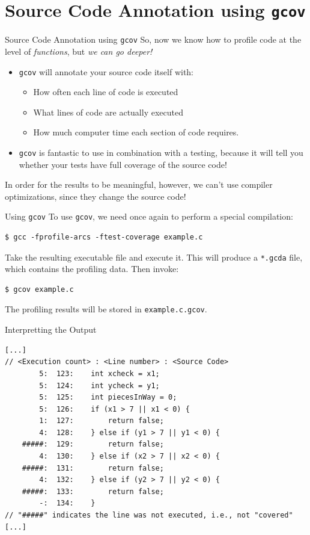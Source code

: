 \documentclass[11pt]{beamer}
\begin{document}
\section[gcov]{Source Code Annotation using \texttt{gcov}}
\begin{frame}{Source Code Annotation using \texttt{gcov}}
So, now we know how to profile code at the level of \emph{functions}, but \emph{we can go deeper!}
\begin{itemize}
\item \texttt{gcov} will annotate your source code itself with: 
\begin{itemize}
\item How often each line of code is executed
\item What lines of code are actually executed
\item How much computer time each section of code requires.
\end{itemize}
\item \texttt{gcov} is fantastic to use in combination with a testing, because it will tell you whether your tests have full coverage of the source code!
\end{itemize}
In order for the results to be meaningful, however, we can't use compiler optimizations, since they change the source code!
\end{frame}

\begin{frame}[fragile=singleslide]{Using \texttt{gcov}}
To use \texttt{gcov}, we need once again to perform a special compilation:
\begin{lstlisting}[style=terminal]
$ gcc -fprofile-arcs -ftest-coverage example.c
\end{lstlisting}
Take the resulting executable file and execute it.  This will produce a \texttt{*.gcda} file, which contains the profiling data. Then invoke:
\begin{lstlisting}[style=terminal]
$ gcov example.c
\end{lstlisting}
The profiling results will be stored in \texttt{example.c.gcov}.
\end{frame}

\begin{frame}[fragile=singleslide]{Interpretting the Output}
\footnotesize
\begin{lstlisting}[style=C]
[...]
// <Execution count> : <Line number> : <Source Code>
        5:  123:	int xcheck = x1;
        5:  124:	int ycheck = y1;
        5:  125:	int piecesInWay = 0;
        5:  126:	if (x1 > 7 || x1 < 0) {
        1:  127:		return false;
        4:  128:	} else if (y1 > 7 || y1 < 0) {
    #####:  129:		return false;
        4:  130:	} else if (x2 > 7 || x2 < 0) {
    #####:  131:		return false;
        4:  132:	} else if (y2 > 7 || y2 < 0) {
    #####:  133:		return false;
        -:  134:	}
// "#####" indicates the line was not executed, i.e., not "covered"
[...]
\end{lstlisting}

\end{frame}
\end{document}

